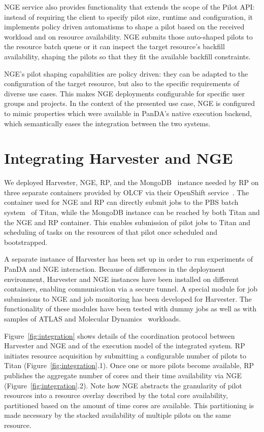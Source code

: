\documentclass{webofc}
\begin{document}
NGE service also provides functionality that extends the scope of the Pilot
API: instead of requiring the client to specify pilot size, runtime and
configuration, it implements policy driven automatisms to shape a pilot based
on the received workload and on resource availability. NGE submits those
auto-shaped pilots to the resource batch queue or it can inspect the target
resource's backfill availability, shaping the pilots so that they fit the
available backfill constraints.
	
NGE's pilot shaping capabilities are policy driven: they can be adapted to
the configuration of the target resource, but also to the specific
requirements of diverse use cases. This makes NGE deployments configurable
for specific user groups and projects. In the context of the presented use
case, NGE is configured to mimic properties which were available in PanDA's
native execution backend, which semantically eases the integration between
the two systems.


\section{Integrating Harvester and NGE}\label{sec:integration}

We deployed Harvester, NGE, RP, and the MongoDB~\citep{chodorow2013mongodb}
instance needed by RP on three separate containers provided by OLCF via their
OpenShift service~\citep{openshift}. The container used for NGE and RP can
directly submit jobs to the PBS batch system~\citep{henderson1995job} of
Titan, while the MongoDB instance can be reached by both Titan and the NGE
and RP container. This enables submission of pilot jobs to Titan and
scheduling of tasks on the resources of that pilot once scheduled and
bootstrapped.

A separate instance of Harvester has been set up in order to run experiments
of PanDA and NGE interaction. Because of differences in the deployment
environment, Harvester and NGE instances have been installed on different
containers, enabling communication via a secure tunnel. A special module for
job submissions to NGE and job monitoring has been developed for Harvester.
The functionality of these modules have been tested with dummy jobs as well
as with samples of ATLAS and Molecular
Dynamics~\citep{3b6dad414e794d36954333f8f177f47c} workloads.

Figure~\ref{fig:integration} shows details of the coordination protocol
between Harvester and NGE and of the execution model of the integrated
system. RP initiates resource acquisition by submitting a configurable number
of pilots to Titan (Figure~\ref{fig:integration}.1). Once one or more pilots
become available, RP publishes the aggregate number of cores and their time
availability via NGE (Figure~\ref{fig:integration}.2). Note how NGE abstracts
the granularity of pilot resources into a resource overlay described by the
total core availability, partitioned based on the amount of time cores are
available. This partitioning is made necessary by the stacked availability of
multiple pilots on the same resource.
\end{document}
